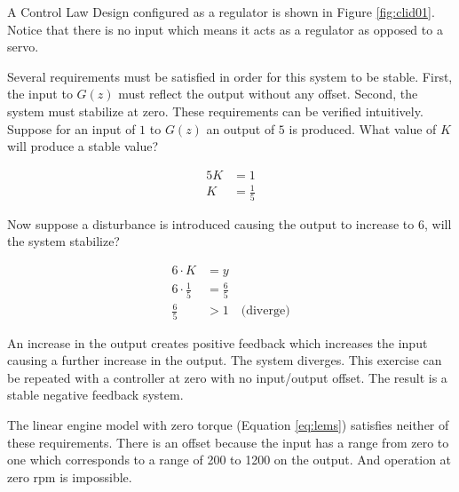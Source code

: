 \documentclass{article}
\begin{document}
A Control Law Design\autocite[Pg. 280]{franklin1998digital} configured
as a regulator is shown in Figure \ref{fig:clid01}.
Notice that there is no input which means it acts as a regulator as
opposed to a servo.

Several requirements must be satisfied in order for this system to be stable.
First, the input to $G(z)$ must reflect the output without any offset.
Second, the system must stabilize at zero.
These requirements can be verified intuitively.
Suppose for an input of $1$ to $G(z)$ an output of $5$ is produced.
What value of $K$ will produce a stable value?

\begin{align*}
	5 K &= 1 \\
	K &= \frac{1}{5}
\end{align*}

Now suppose a disturbance is introduced causing the output to increase
to $6$, will the system stabilize?

\begin{align*}
	6 \cdot K &= y \\
	6 \cdot \frac{1}{5} &= \frac{6}{5} \\
	\frac{6}{5} &> 1 \quad \text{(diverge)}
\end{align*}

An increase in the output creates positive feedback which increases
the input causing a further increase in the output.
The system diverges.
This exercise can be repeated with a controller at zero with
no input/output offset.
The result is a stable negative feedback system.

The linear engine model with zero torque (Equation \ref{eq:lems})
satisfies neither of these requirements.
There is an offset because the input has a range from zero to one which
corresponds to a range of 200 to 1200 on the output.
And operation at zero rpm is impossible.
\end{document}
